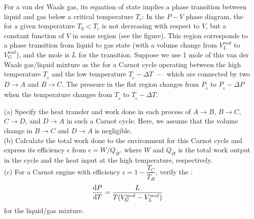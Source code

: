 \begin{example}
    For a van der Waals gas, its equation of state implies a phase transition between
    liquid and gas below a critical temperature $T_c$: In the $P-V$ phase
    diagram, the  for a given temperature $T_{0} < T_{c}$ is not 
    decreasing with respect to $V$, but a constant function of $V$ in some region (see the
    figure). This region corresponds to a phase transition from liquid to gas state (with a
    volume change from $V_{L}^{mol}$ to $V_{G}^{mol}$), and the mole  is $L$ for the transition.
    Suppose we use 1 mole of this van der Waals gas/liquid mixture as the  for
    a Carnot cycle operating between the high temperature $T_{_0}$ and the low temperature
    $T_{_0}-\Delta T$\ —\ which are connected by two  $D\rightarrow A$ and $B\rightarrow C$.
    The pressure in the flat region changes from $P_{_0}$ to $P_{_0}-\Delta P$ when the temperature
    changes from $T_{_0}$ to $T_{_0}-\Delta T$.

    (a) Specify the heat transfer and work done in each process of $A\rightarrow B$, $B\rightarrow C$,
    $C\rightarrow D$, and $D\rightarrow A$ in such a Carnot cycle. Here, we assume that the volume
    change in $B\rightarrow C$ and $D\rightarrow A$ is negligible.\\
    (b) Calculate the total work done to the environment for this Carnot cycle and express
    its efficiency $\epsilon$ from $\epsilon = W/Q_H$. where $W$ and $Q_H$ is the total work output in
    the cycle and the heat input at the high temperature, respectively.\\
    (c) For a Carnot engine with efficiency $\epsilon = 1-\dfrac{T_C}{T_H}$, verify the :
    \begin{equation*}
        \frac{\dif{P}}{\dif{T}}=\frac{L}{T(V_{G}^{mol}-V_{L}^{mol})}
    \end{equation*}
    for the liquid/gas mixture.
\end{example}
